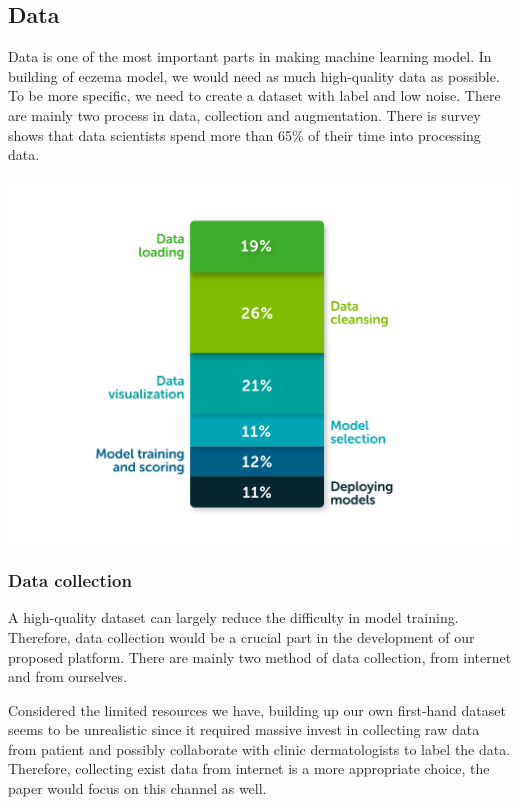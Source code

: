     \subsection{Data}
        Data is one of the most important parts in making machine learning model. In building of eczema model, we would need as much high-quality data as possible. To be more specific, we need to create a dataset with label and low noise. There are mainly two process in data, collection and augmentation. There is survey shows that data scientists spend more than 65\% of their time into processing data\cite{AnacondaSurvey}.
        \begin{Figure}
            \centering
            \includegraphics[width=\linewidth]{Image/Stacked-Chart.png}
        \end{Figure}
            \subsubsection{Data collection}
                A high-quality dataset can largely reduce the difficulty in model training. Therefore, data collection would be a crucial part in the development of our proposed platform. There are mainly two method of data collection, from internet and from ourselves.

                Considered the limited resources we have, building up our own first-hand dataset seems to be unrealistic since it required massive invest in collecting raw data from patient and possibly collaborate with clinic dermatologists to label the data. Therefore, collecting exist data from internet is a more appropriate choice, the paper would focus on this channel as well.

